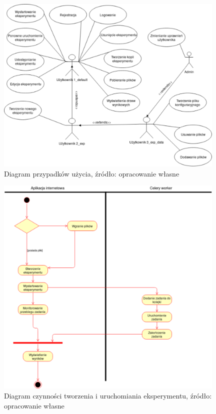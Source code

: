 \begin{figure}[htb]
\centering
\includegraphics[width=11cm]{grafika/diagram_przypadkow_uzycia.eps}
\caption{Diagram przypadków użycia, źródło: opracowanie własne}
\label{rys1_diagram_przypadkow}
\end{figure}

\begin{figure}[htb]
	\centering
	\includegraphics[width=11cm]{grafika/diagram_przebiegu_tworzenia_eksperymentu.eps}
	\caption{Diagram czynności tworzenia i uruchomiania eksperymentu, źródło: opracowanie własne}
	\label{rys2_diagram_czynności}
\end{figure}

